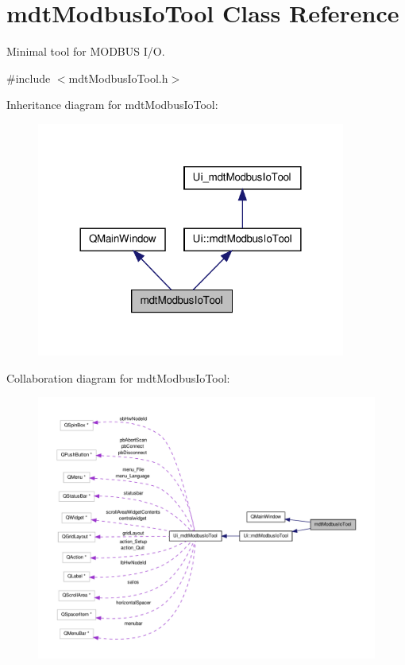 \hypertarget{classmdt_modbus_io_tool}{\section{mdt\-Modbus\-Io\-Tool Class Reference}
\label{classmdt_modbus_io_tool}
}


Minimal tool for M\-O\-D\-B\-U\-S I/\-O.  




{\ttfamily \#include $<$mdt\-Modbus\-Io\-Tool.\-h$>$}



Inheritance diagram for mdt\-Modbus\-Io\-Tool\-:
\nopagebreak
\begin{figure}[H]
\begin{center}
\leavevmode
\includegraphics[width=288pt]{classmdt_modbus_io_tool__inherit__graph}
\end{center}
\end{figure}


Collaboration diagram for mdt\-Modbus\-Io\-Tool\-:
\nopagebreak
\begin{figure}[H]
\begin{center}
\leavevmode
\includegraphics[width=350pt]{classmdt_modbus_io_tool__coll__graph}
\end{center}
\end{figure}
